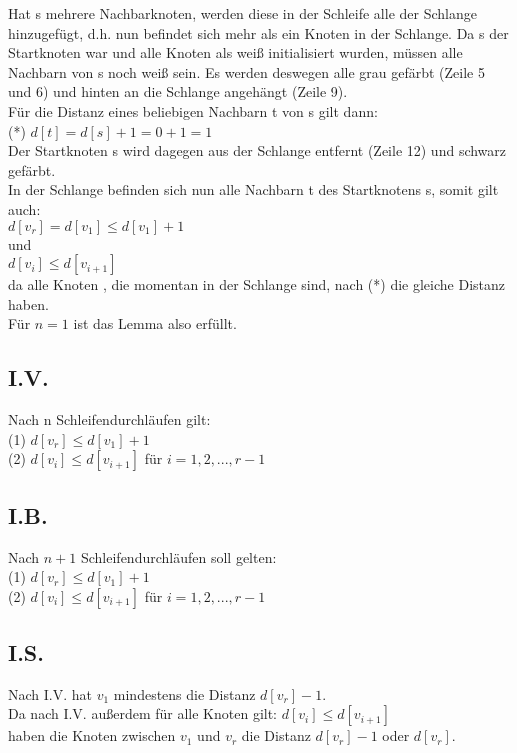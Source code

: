 \documentclass[11pt, oneside]{article}   	%
\begin{document}
Hat s mehrere Nachbarknoten, werden diese in der Schleife alle der Schlange hinzugefügt, d.h. nun befindet sich mehr als ein Knoten in der Schlange. Da s der Startknoten war und alle Knoten als weiß initialisiert wurden, müssen alle Nachbarn von s noch weiß sein. Es werden deswegen alle grau gefärbt (Zeile 5 und 6) und hinten an die Schlange angehängt (Zeile 9). \\
Für die Distanz eines beliebigen Nachbarn t von s gilt dann:\\
(*) $d[t] = d[s] + 1 = 0 + 1 = 1$\\
Der Startknoten s wird dagegen aus der Schlange entfernt (Zeile 12) und schwarz gefärbt.\\

In der Schlange befinden sich nun alle Nachbarn t des Startknotens s, somit gilt auch:\\
$ d[v_r] = d[v_1] \le d[v_1] + 1$ \\
und \\
$ d[v_i] \le d[v_{i+1}]  $ \\
da alle Knoten , die momentan in der Schlange sind, nach (*) die gleiche Distanz haben.\\

Für $ n = 1$ ist das Lemma also erfüllt.

\subsection*{I.V.}
Nach n Schleifendurchläufen gilt: \\
(1) $ d[v_r] \le d[v_1] + 1$ \\
(2) $ d[v_i] \le d[v_{i+1}]  $ für $ i = 1, 2, ..., r -1  $ \\

\subsection*{I.B.}

Nach $n+1$ Schleifendurchläufen soll gelten:  \\
(1) $ d[v_r] \le d[v_1] + 1$ \\
(2) $ d[v_i] \le d[v_{i+1}]  $ für $ i = 1, 2, ..., r -1  $ \\

\subsection*{I.S.}
Nach I.V. hat $v_1$ mindestens die Distanz $d[v_r] - 1$. \\
Da nach I.V. außerdem für alle Knoten gilt: $ d[v_i] \le d[v_{i+1}] $\\
haben die Knoten zwischen $v_1$ und $v_r$ die Distanz $d[v_r] - 1$ oder $d[v_r]$. \\
\end{document}
